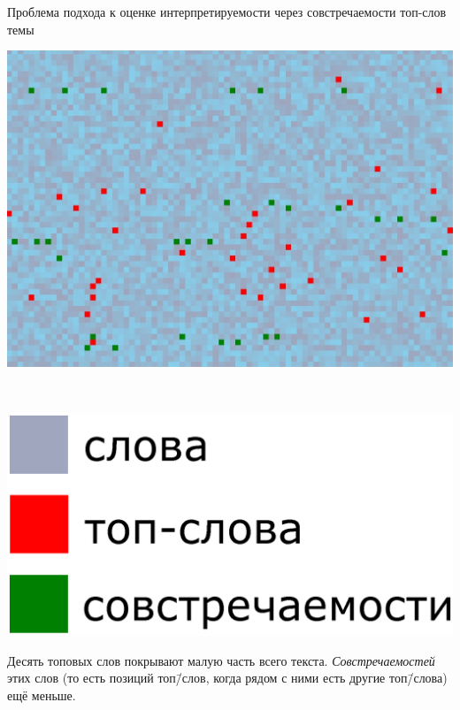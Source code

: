 \documentclass[sans, mathsans, russian]{beamer}
\begin{document}
\begin{frame}{Проблема подхода к оценке интерпретируемости через совстречаемости топ-слов темы}
  \begin{minipage}{0.68\textwidth}
    \includegraphics[width=\textwidth]{doc11358_topic0.jpg}
  \end{minipage}
  ~
  \begin{minipage}{0.28\textwidth}
    \includegraphics[width=\textwidth]{legend.eps}
  \end{minipage}
  \begin{block}{}
    Десять топовых слов покрывают малую часть всего текста.
    \emph{Совстречаемостей} этих слов (то есть позиций топ\=/слов, когда рядом с ними есть другие топ\=/слова) ещё меньше.
  \end{block}
\end{frame}
\end{document}
